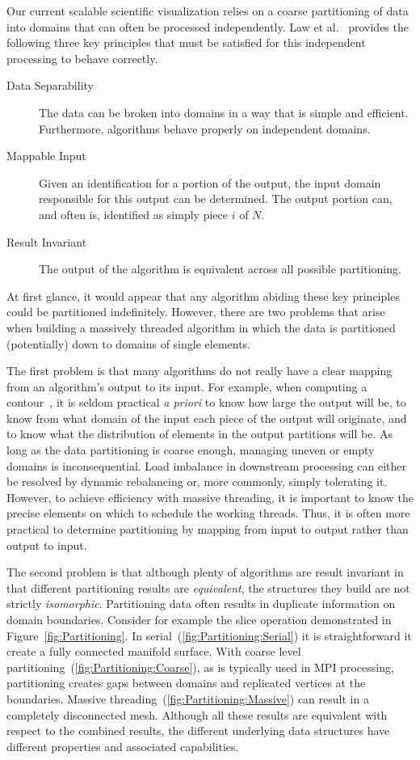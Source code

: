\documentclass{sig-alternate}
\newcommand*{\lcite}[1]{~\cite{#1}}
\newcommand*{\scite}[1]{~\cite{#1}}
\newcommand{\etal}{et al.}
\begin{document}
\noindent
Our current scalable scientific visualization relies on a coarse
partitioning of data into domains that can often be processed
independently. Law \etal\scite{Law1999} provides the following three key
principles that must be satisfied for this independent processing to behave
correctly.

\begin{description}
\item[Data Separability] The data can be broken into domains in a way that
  is simple and efficient. Furthermore, algorithms behave properly on
  independent domains.
\item[Mappable Input] Given an identification for a portion of the output,
  the input domain responsible for this output can be determined. The
  output portion can, and often is, identified as simply piece $i$ of $N$.
\item[Result Invariant] The output of the algorithm is equivalent across
  all possible partitioning.
\end{description}

At first glance, it would appear that any algorithm abiding these key
principles could be partitioned indefinitely. However, there are two
problems that arise when building a massively threaded algorithm in which
the data is partitioned (potentially) down to domains of single elements.

The first problem is that many algorithms do not really have a clear
mapping from an algorithm's output to its input. For example, when
computing a contour\lcite{Lorensen1987}, it is seldom practical \emph{a
  priori} to know how large the output will be, to know from what domain of
the input each piece of the output will originate, and to know what the
distribution of elements in the output partitions will be. As long as the
data partitioning is coarse enough, managing uneven or empty domains is
inconsequential. Load imbalance in downstream processing can either be
resolved by dynamic rebalancing or, more commonly, simply tolerating
it. However, to achieve efficiency with massive threading, it is important
to know the precise elements on which to schedule the working
threads. Thus, it is often more practical to determine partitioning by
mapping from input to output rather than output to input.

The second problem is that although plenty of algorithms are result
invariant in that different partitioning results are \emph{equivalent}, the
structures they build are not strictly \emph{isomorphic}. Partitioning data
often results in duplicate information on domain boundaries. Consider for
example the slice operation demonstrated in
Figure~\ref{fig:Partitioning}. In serial~(\ref{fig:Partitioning:Serial}) it
is straightforward it create a fully connected manifold surface. With
coarse level partitioning~(\ref{fig:Partitioning:Coarse}), as is typically
used in MPI processing, partitioning creates gaps between domains and
replicated vertices at the boundaries. Massive
threading~(\ref{fig:Partitioning:Massive}) can result in a completely
disconnected mesh. Although all these results are equivalent with respect
to the combined results, the different underlying data structures have
different properties and associated capabilities.
\end{document}
